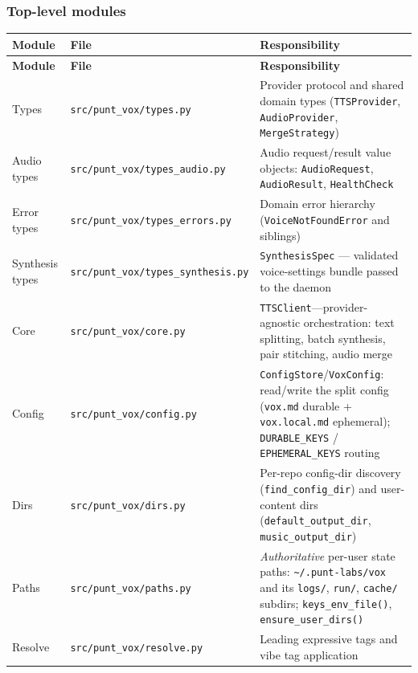 \documentclass[a4paper,10pt]{article}
\newcommand{\modpath}[1]{\texttt{src/punt\_vox/#1}}
\begin{document}
\subsubsection*{Top-level modules}

\begin{center}
\begin{longtable}{llp{6.2cm}}
\toprule
\textbf{Module} & \textbf{File} & \textbf{Responsibility} \\
\midrule
\endfirsthead
\toprule
\textbf{Module} & \textbf{File} & \textbf{Responsibility} \\
\midrule
\endhead
Types      & \modpath{types.py}      & Provider protocol and shared
             domain types (\texttt{TTSProvider}, \texttt{AudioProvider},
             \texttt{MergeStrategy}) \\
Audio types & \modpath{types\_audio.py} & Audio request/result value
             objects: \texttt{AudioRequest}, \texttt{AudioResult},
             \texttt{HealthCheck} \\
Error types & \modpath{types\_errors.py} & Domain error hierarchy
             (\texttt{VoiceNotFoundError} and siblings) \\
Synthesis types & \modpath{types\_synthesis.py} & \texttt{SynthesisSpec}
             --- validated voice-settings bundle passed to the daemon \\
Core       & \modpath{core.py}       & \texttt{TTSClient}---provider-agnostic
             orchestration: text splitting, batch synthesis, pair
             stitching, audio merge \\
Config     & \modpath{config.py}     & \texttt{ConfigStore}/\texttt{VoxConfig}:
             read/write the split config (\texttt{vox.md} durable +
             \texttt{vox.local.md} ephemeral); \texttt{DURABLE\_KEYS} /
             \texttt{EPHEMERAL\_KEYS} routing \\
Dirs       & \modpath{dirs.py}       & Per-repo config-dir discovery
             (\texttt{find\_config\_dir}) and user-content dirs
             (\texttt{default\_output\_dir}, \texttt{music\_output\_dir}) \\
Paths      & \modpath{paths.py}      & \emph{Authoritative} per-user
             state paths: \texttt{\~{}/.punt-labs/vox} and its
             \texttt{logs/}, \texttt{run/}, \texttt{cache/} subdirs;
             \texttt{keys\_env\_file()}, \texttt{ensure\_user\_dirs()} \\
Resolve    & \modpath{resolve.py}    & Leading expressive tags and
             vibe tag application \\

\end{longtable}
\end{center}
\end{document}
